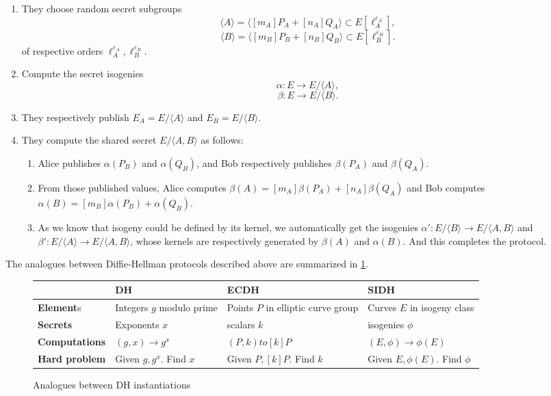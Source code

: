 \documentclass{article}
\theoremstyle{theorem}
\theoremstyle{definition}
\begin{document}
\begin{enumerate}
	\item They choose random secret subgroups
		\[ \langle A \rangle = \langle [m_A]P_A + [n_A]Q_A \rangle \subset E[\ell_A^{\varepsilon_A}], \]
		\[ \langle B \rangle = \langle [m_B]P_B +[n_B]Q_B \rangle \subset E[\ell_B^{\varepsilon_B}]. \]
		of respective orders $\ell_A^{\varepsilon_A}, \ell_B^{\varepsilon_B}$.
		
	\item Compute the secret isogenies
		\[ \alpha: E \to E/\langle A \rangle, \]
		\[ \beta: E \to E/\langle B \rangle. \]
		
	\item They respectively publish $E_A = E/\langle A \rangle$ and $E_B = E/\langle B \rangle$.
	
	\item They compute the shared secret $E / \langle A, B \rangle$ as follows:
		
		\begin{enumerate}
			\item Alice publishes $\alpha(P_B)$ and $\alpha(Q_B)$, and Bob respectively publishes $\beta(P_A)$ and $\beta(Q_A)$. 
			
			\item From those published values, Alice computes $\beta(A) = [m_A]\beta(P_A) + [n_A]\beta(Q_A)$ and Bob computes $\alpha(B) = [m_B]\alpha(P_B) + \alpha(Q_B) $.
			
			\item As we know that isogeny could be defined by its kernel, we automatically get the isogenies $\alpha': E/\langle B \rangle \to E/\langle A, B \rangle$ and $\beta': E/\langle A \rangle \to E/\langle A, B \rangle$, whose kernels are respectively generated by $\beta(A)$ and $\alpha(B)$. And this completes the protocol.
		\end{enumerate}
\end{enumerate}

The analogues between Diffie-Hellman protocols described above are summarized in \cref{DH-Analogues-table:figure}.

\begin{figure}[h]
	\begin{center}
		\begin{tabular}{| m{2.3cm} | m{2.5cm} m{2.5cm} m{2.5cm} |}
			\hline
			~ & DH & ECDH & SIDH\\
			\hline
			\textbf{Element}s & Integers $g$ modulo prime & Points $P$ in elliptic curve group & Curves $E$ in isogeny class\\
			\hline
			\textbf{Secrets} & Exponents $x$ & scalars $k$ & isogenies $\phi$ \\
			\hline
			\textbf{Computations} & $(g, x) \to g^x$ & $(P, k) to [k]P$ & $(E, \phi) \to \phi(E)$\\
			\hline
			\textbf{Hard problem} & Given $g, g^x$. Find $x$ & Given $P,[k]P$. Find $k$ & Given $E, \phi(E)$. Find $\phi$\\
			\hline 
		\end{tabular}
	\end{center}
\caption{Analogues between DH instantiations}\label{DH-Analogues-table:figure}
\end{figure}
\end{document}
